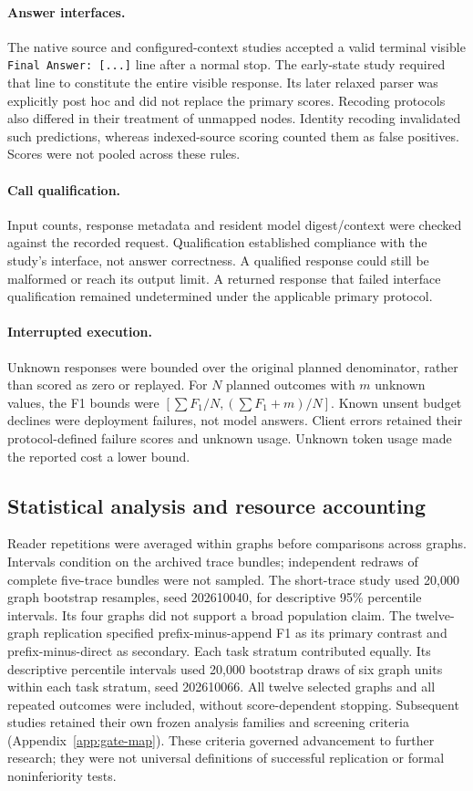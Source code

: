 \paragraph{Answer interfaces.} The native source and configured-context studies accepted a valid terminal visible \texttt{Final Answer: [...]} line after a normal stop. The early-state study required that line to constitute the entire visible response. Its later relaxed parser was explicitly post hoc and did not replace the primary scores. Recoding protocols also differed in their treatment of unmapped nodes. Identity recoding invalidated such predictions, whereas indexed-source scoring counted them as false positives. Scores were not pooled across these rules.

\paragraph{Call qualification.} Input counts, response metadata and resident model digest/context were checked against the recorded request. Qualification established compliance with the study's interface, not answer correctness. A qualified response could still be malformed or reach its output limit. A returned response that failed interface qualification remained undetermined under the applicable primary protocol.

\paragraph{Interrupted execution.} Unknown responses were bounded over the original planned denominator, rather than scored as zero or replayed. For $N$ planned outcomes with $m$ unknown values, the F1 bounds were $[\sum F_1/N,(\sum F_1+m)/N]$. Known unsent budget declines were deployment failures, not model answers. Client errors retained their protocol-defined failure scores and unknown usage. Unknown token usage made the reported cost a lower bound.

\subsection{Statistical analysis and resource accounting}
Reader repetitions were averaged within graphs before comparisons across graphs. Intervals condition on the archived trace bundles; independent redraws of complete five-trace bundles were not sampled. The short-trace study used 20,000 graph bootstrap resamples, seed 202610040, for descriptive 95\% percentile intervals. Its four graphs did not support a broad population claim. The twelve-graph replication specified prefix-minus-append F1 as its primary contrast and prefix-minus-direct as secondary. Each task stratum contributed equally. Its descriptive percentile intervals used 20,000 bootstrap draws of six graph units within each task stratum, seed 202610066. All twelve selected graphs and all repeated outcomes were included, without score-dependent stopping. Subsequent studies retained their own frozen analysis families and screening criteria (Appendix~\ref{app:gate-map}). These criteria governed advancement to further research; they were not universal definitions of successful replication or formal noninferiority tests.

